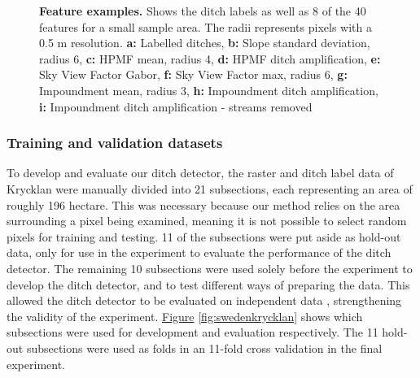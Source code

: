 \documentclass[11pt, review]{elsarticle} %
\begin{document}
\begin{figure} [!htb]
{        }
    \caption{\textbf{Feature examples.} Shows the ditch labels as well as 8 of the 40 features for a small sample area. The radii represents pixels with a 0.5 m resolution. \newline \textbf{a:} Labelled ditches, \textbf{b:} Slope standard deviation, radius 6, \textbf{c:} HPMF mean, radius 4, \textbf{d:} HPMF ditch amplification, \textbf{e:} Sky View Factor Gabor, \textbf{f:} Sky View Factor max, radius 6, \textbf{g:} Impoundment mean, radius 3, \textbf{h:} Impoundment ditch amplification, \textbf{i:} Impoundment ditch amplification - streams removed}
    \label{fig:features}
\end{figure}

\subsubsection{Training and validation datasets}
\label{trainingvalidationdatasets}
To develop and evaluate our ditch detector, the raster and ditch label data of Krycklan were manually divided into 21 subsections, each representing an area of roughly 196 hectare. This was necessary because our method relies on the area surrounding a pixel being examined, meaning it is not possible to select random pixels for training and testing. 11 of the subsections were put aside as hold-out data, only for use in the experiment to evaluate the performance of the ditch detector. The remaining 10 subsections were used solely before the experiment to develop the ditch detector, and to test different ways of preparing the data. This allowed the ditch detector to be evaluated on independent data , strengthening the validity of the experiment. \hyperref[fig:swedenkrycklan]{Figure} \ref{fig:swedenkrycklan} shows which subsections were used for development and evaluation respectively. The 11 hold-out subsections were used as folds in an 11-fold cross validation in the final experiment.
\end{document}
